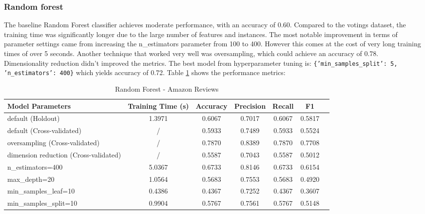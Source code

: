 \documentclass{article}
\begin{document}
\subsubsection*{Random forest}
The baseline Random Forest classifier achieves moderate performance, with an accuracy of 0.60. Compared to the votings dataset, the training time was significantly longer due to the large number of features and instances. The most notable improvement in terms of parameter settings came from increasing the n\_estimators parameter from 100 to 400. However this comes at the cost of very long training times of over 5 seconds. Another technique that worked very well was oversampling, which could achieve an accuracy of 0.78. Dimensionality reduction didn't improved the metrics. The best model from hyperparameter tuning is: \texttt{\{'min\_samples\_split': 5, 'n\_estimators': 400\}} which yields accuracy of 0.72. Table \ref{tab:Random Forest - Amazon Reviews} shows the performance metrics:

\begin{table}[H]
\centering
\begin{tabular}{l|c|c|c|c|c|c}
\textbf{Model Parameters} & \textbf{Training Time (s)} & \textbf{Accuracy} & \textbf{Precision} & \textbf{Recall} & \textbf{F1} \\\hline
default (Holdout) & 1.3971  & 0.6067 & 0.7017 & 0.6067 & 0.5817 \\
default (Cross-validated) & /  & 0.5933 & 0.7489 & 0.5933 & 0.5524 \\
oversampling (Cross-validated) & /  & 0.7870 & 0.8389 & 0.7870 & 0.7708 \\
dimension reduction (Cross-validated) & /  & 0.5587 & 0.7043 & 0.5587 & 0.5012 \\
n\_estimators=400 & 5.0367  & 0.6733 & 0.8146 & 0.6733 & 0.6154 \\
max\_depth=20 & 1.0564  & 0.5683 & 0.7553 & 0.5683 & 0.4920 \\
min\_samples\_leaf=10 & 0.4386  & 0.4367 & 0.7252 & 0.4367 & 0.3607 \\
min\_samples\_split=10 & 0.9904  & 0.5767 & 0.7561 & 0.5767 & 0.5148 \\
\end{tabular}
\caption{Random Forest - Amazon Reviews}
\label{tab:Random Forest - Amazon Reviews}
\end{table}
\end{document}
